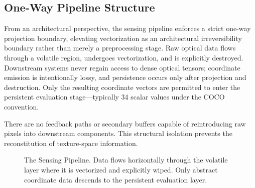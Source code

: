\documentclass[conference]{IEEEtran}
\begin{document}
\subsection{One-Way Pipeline Structure}

From an architectural perspective, the sensing pipeline enforces a strict one-way projection boundary, elevating vectorization as an architectural irreversibility boundary rather than merely a preprocessing stage. Raw optical data flows through a volatile region, undergoes vectorization, and is explicitly destroyed. Downstream systems never regain access to dense optical tensors; coordinate emission is intentionally lossy, and persistence occurs only after projection and destruction. Only the resulting coordinate vectors are permitted to enter the persistent evaluation stage—typically 34 scalar values under the COCO convention.

There are no feedback paths or secondary buffers capable of reintroducing raw pixels into downstream components. This structural isolation prevents the reconstitution of texture-space information.

\begin{figure}[htbp]
\centering
{}
\caption{The Sensing Pipeline. Data flows horizontally through the volatile layer where it is vectorized and explicitly wiped. Only abstract coordinate data descends to the persistent evaluation layer.}
\label{fig:arch}
\end{figure}
\end{document}
